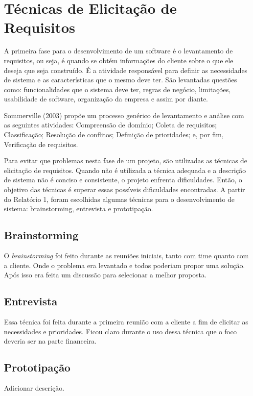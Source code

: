 \chapter[Técnicas de Elicitação de Requisitos]{Técnicas de Elicitação de Requisitos}
A primeira fase para o desenvolvimento de um software é o levantamento de
requisitos, ou seja, é quando se obtém informações do cliente sobre o que ele
deseja que seja construído. É a atividade responsável para definir as necessidades
de sistema e as características que o mesmo deve ter. São levantadas questões como:
funcionalidades que o sistema deve ter, regras de negócio, limitações, usabilidade
de software, organização da empresa e assim por diante.

Sommerville (2003) propõe um processo genérico de levantamento e análise com as
seguintes atividades: Compreensão de domínio; Coleta de requisitos;
Classificação; Resolução de conflitos; Definição de prioridades; e, por fim,
Verificação de requisitos.

Para evitar que problemas nesta fase de um projeto, são utilizadas as
técnicas de elicitação de requisitos. Quando não é utilizada a técnica adequada
 e a descrição de sistema não é conciso e consistente, o projeto enfrenta
dificuldades. Então, o objetivo das técnicas é superar essas possíveis
dificuldades encontradas.
A partir do Relatório 1, foram escolhidas algumas técnicas para o
desenvolvimento de sistema: brainstorming, entrevista e prototipação.

\section[Brainstorming]{Brainstorming}
O \textsl{brainstorming} foi feito durante as reuniões iniciais, tanto com
time quanto com a cliente. Onde o problema era levantado e todos poderiam propor
uma solução. Após isso era feita um discussão para selecionar a melhor proposta.

\section[Entrevista]{Entrevista}
Essa técnica foi feita durante a primeira reunião com a cliente a fim de
elicitar as necessidades e prioridades. Ficou claro durante o uso dessa
técnica que o foco deveria ser na parte financeira.

\section[Prototipação]{Prototipação}
Adicionar descrição.

